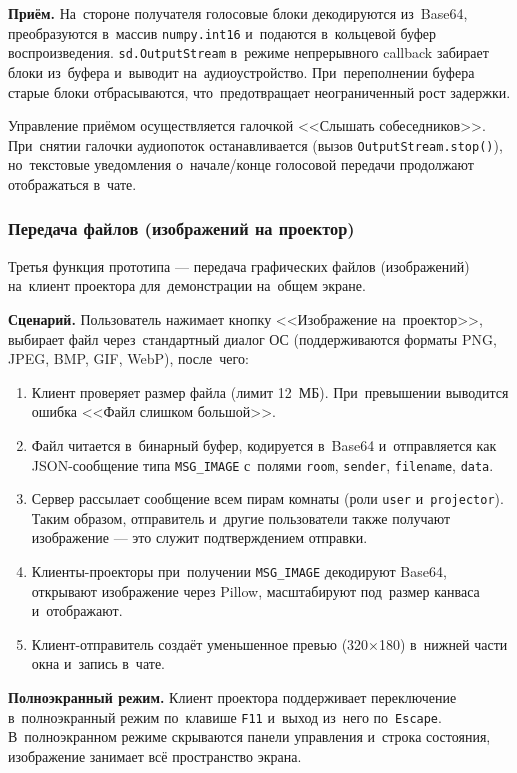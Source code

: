 \textbf{Приём.} На~стороне получателя голосовые блоки декодируются из~Base64, преобразуются в~массив \texttt{numpy.int16} и~подаются в~кольцевой буфер воспроизведения. \texttt{sd.OutputStream} в~режиме непрерывного callback забирает блоки из~буфера и~выводит на~аудиоустройство. При~переполнении буфера старые блоки отбрасываются, что~предотвращает неограниченный рост задержки.

Управление приёмом осуществляется галочкой <<Слышать собеседников>>. При~снятии галочки аудиопоток останавливается (вызов \texttt{OutputStream.stop()}), но~текстовые уведомления о~начале/конце голосовой передачи продолжают отображаться в~чате.

\subsubsection{Передача файлов (изображений на проектор)}

Третья функция прототипа --- передача графических файлов (изображений) на~клиент проектора для~демонстрации на~общем экране.

\textbf{Сценарий.} Пользователь нажимает кнопку <<Изображение на~проектор>>, выбирает файл через~стандартный диалог ОС (поддерживаются форматы PNG, JPEG, BMP, GIF, WebP), после~чего:

\begin{enumerate}
  \item Клиент проверяет размер файла (лимит 12~МБ). При~превышении выводится ошибка <<Файл слишком большой>>.
  \item Файл читается в~бинарный буфер, кодируется в~Base64 и~отправляется как JSON-сообщение типа \texttt{MSG\_IMAGE} с~полями \texttt{room}, \texttt{sender}, \texttt{filename}, \texttt{data}.
  \item Сервер рассылает сообщение всем пирам комнаты (роли \texttt{user} и~\texttt{projector}). Таким образом, отправитель и~другие пользователи также получают изображение --- это служит подтверждением отправки.
  \item Клиенты-проекторы при~получении \texttt{MSG\_IMAGE} декодируют Base64, открывают изображение через Pillow, масштабируют под~размер канваса и~отображают.
  \item Клиент-отправитель создаёт уменьшенное превью (320$\times$180) в~нижней части окна и~запись в~чате.
\end{enumerate}

\textbf{Полноэкранный режим.} Клиент проектора поддерживает переключение в~полноэкранный режим по~клавише \texttt{F11} и~выход из~него по~\texttt{Escape}. В~полноэкранном режиме скрываются панели управления и~строка состояния, изображение занимает всё пространство экрана.

